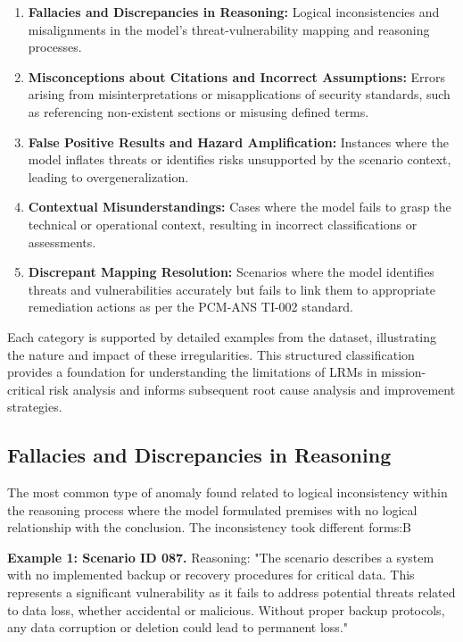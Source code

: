 \documentclass[sigconf]{acmart}
\begin{document}
\begin{enumerate}
    \item \textbf{Fallacies and Discrepancies in Reasoning:} Logical inconsistencies and misalignments in the model's threat-vulnerability mapping and reasoning processes.
    
    \item \textbf{Misconceptions about Citations and Incorrect Assumptions:} Errors arising from misinterpretations or misapplications of security standards, such as referencing non-existent sections or misusing defined terms.
    
    \item \textbf{False Positive Results and Hazard Amplification:} Instances where the model inflates threats or identifies risks unsupported by the scenario context, leading to overgeneralization.
    
    \item \textbf{Contextual Misunderstandings:} Cases where the model fails to grasp the technical or operational context, resulting in incorrect classifications or assessments.
    
    \item \textbf{Discrepant Mapping Resolution:} Scenarios where the model identifies threats and vulnerabilities accurately but fails to link them to appropriate remediation actions as per the PCM-ANS TI-002 standard.
\end{enumerate}    

Each category is supported by detailed examples from the dataset, illustrating the nature and impact of these irregularities. This structured classification provides a foundation for understanding the limitations of LRMs in mission-critical risk analysis and informs subsequent root cause analysis and improvement strategies.

\subsection{Fallacies and Discrepancies in Reasoning}
The most common type of anomaly found related to logical inconsistency within the reasoning process where the model formulated premises with no logical relationship with the conclusion. The inconsistency took different forms:B 

\textbf{Example 1: Scenario ID 087.} Reasoning: "The scenario describes a system with no implemented backup or recovery procedures for critical data. This represents a significant vulnerability as it fails to address potential threats related to data loss, whether accidental or malicious. Without proper backup protocols, any data corruption or deletion could lead to permanent loss."
\end{document}

